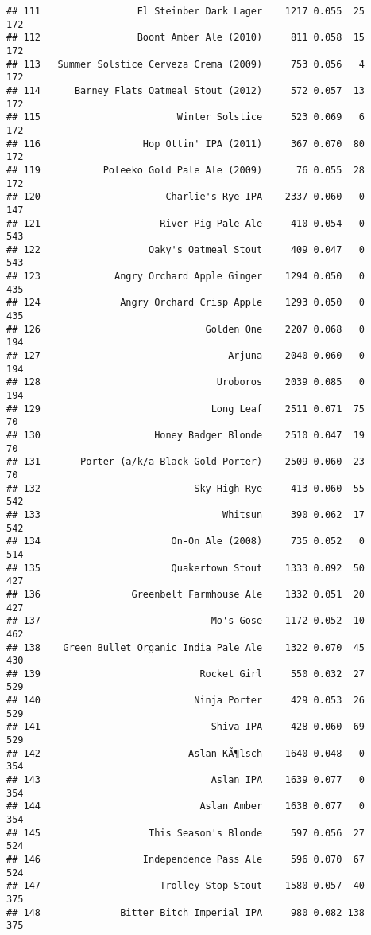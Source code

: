\documentclass[
]{article}
\begin{document}
\begin{verbatim}
## 111                 El Steinber Dark Lager    1217 0.055  25        172
## 112                 Boont Amber Ale (2010)     811 0.058  15        172
## 113   Summer Solstice Cerveza Crema (2009)     753 0.056   4        172
## 114      Barney Flats Oatmeal Stout (2012)     572 0.057  13        172
## 115                        Winter Solstice     523 0.069   6        172
## 116                  Hop Ottin' IPA (2011)     367 0.070  80        172
## 119           Poleeko Gold Pale Ale (2009)      76 0.055  28        172
## 120                      Charlie's Rye IPA    2337 0.060   0        147
## 121                     River Pig Pale Ale     410 0.054   0        543
## 122                   Oaky's Oatmeal Stout     409 0.047   0        543
## 123             Angry Orchard Apple Ginger    1294 0.050   0        435
## 124              Angry Orchard Crisp Apple    1293 0.050   0        435
## 126                             Golden One    2207 0.068   0        194
## 127                                 Arjuna    2040 0.060   0        194
## 128                               Uroboros    2039 0.085   0        194
## 129                              Long Leaf    2511 0.071  75         70
## 130                    Honey Badger Blonde    2510 0.047  19         70
## 131       Porter (a/k/a Black Gold Porter)    2509 0.060  23         70
## 132                           Sky High Rye     413 0.060  55        542
## 133                                Whitsun     390 0.062  17        542
## 134                       On-On Ale (2008)     735 0.052   0        514
## 135                       Quakertown Stout    1333 0.092  50        427
## 136                Greenbelt Farmhouse Ale    1332 0.051  20        427
## 137                              Mo's Gose    1172 0.052  10        462
## 138    Green Bullet Organic India Pale Ale    1322 0.070  45        430
## 139                            Rocket Girl     550 0.032  27        529
## 140                           Ninja Porter     429 0.053  26        529
## 141                              Shiva IPA     428 0.060  69        529
## 142                          Aslan KÃ¶lsch    1640 0.048   0        354
## 143                              Aslan IPA    1639 0.077   0        354
## 144                            Aslan Amber    1638 0.077   0        354
## 145                   This Season's Blonde     597 0.056  27        524
## 146                  Independence Pass Ale     596 0.070  67        524
## 147                     Trolley Stop Stout    1580 0.057  40        375
## 148              Bitter Bitch Imperial IPA     980 0.082 138        375

\end{verbatim}
\end{document}

